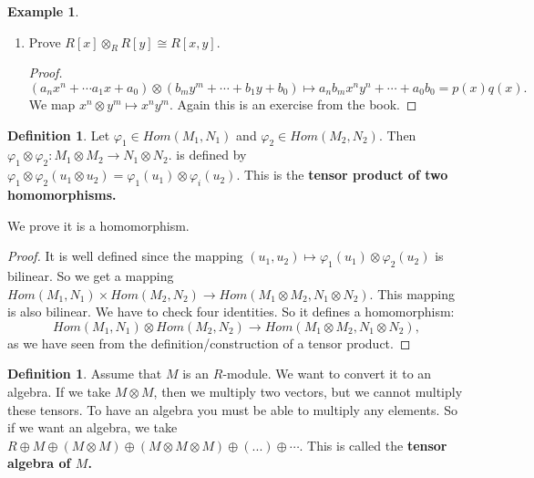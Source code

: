 \documentclass[9pt,reqno,twoside]{amsbook}
\theoremstyle{plain}
\numberwithin{section}{chapter}
\numberwithin{equation}{chapter}
\theoremstyle{definition}
\newtheorem{Def}[theorem]{Definition}
\newtheorem{Ex}[theorem]{Example}
\theoremstyle{remark}
\theoremstyle{plain}
\newcommand{\tens}{\otimes}
\renewcommand{\phi}{\varphi}
\begin{document}
\begin{Ex}
\begin{enumerate}
\begin{proof}
You need to check something like this:
$$
(\alpha_1 \tens (a_1x^n + \cdots + a_1x + a_0)) \cdot (\alpha_2 \tens (...)).
$$
The map would be given by: 
$$
\alpha_1 \tens (a_1x^n + \cdots + a_1x + a_0)\mapsto a_n\alpha x^n + \cdots a_1 \alpha x + a_0\alpha.
$$
Here it is just defined for simple tensors. So any polynomial of $S$ is the image of some tensor, since we have:
$$
\alpha_n \tens x^n + \cdots + \alpha_1 \tens x + \alpha_0 \tens 1 \mapsto \alpha_nx^n + \cdots + \alpha_1 x + \alpha_0.
$$
\end{proof}

\item Prove $R[x] \tens_R R[y] \cong R[x,y]$. 

\begin{proof}
$$
(a_nx^n + \cdots a_1 x + a_0) \tens (b_my^m + \cdots + b_1 y + b_0) \mapsto a_nb_mx^ny^n + \cdots + a_0b_0 = p(x)q(x).
$$
We map $x^n \tens y^m \mapsto x^n y^m$. Again this is an exercise from the book. 
\end{proof}

\end{enumerate}
\end{Ex}

\begin{Def}
Let $\phi_1 \in Hom(M_1,N_1)$ and $\phi_2 \in Hom(M_2,N_2)$. Then $\phi_1 \tens \phi_2: M_1 \tens M_2 \to N_1 \tens N_2$. is defined by $\phi_1 \tens \phi_2(u_1 \tens u_2) = \phi_1(u_1) \tens \phi_i(u_2)$. This is the \textbf{tensor product of two homomorphisms. }
\end{Def}
We prove it is a homomorphism. 
\begin{proof}
It is well defined since the mapping $(u_1,u_2) \mapsto \phi_1(u_1) \tens \phi_2(u_2)$ is bilinear. 
So we get a mapping $Hom(M_1,N_1) \times Hom(M_2,N_2) \to Hom(M_1 \tens M_2,N_1 \tens N_2)$. This mapping is also bilinear. We have to check four identities. So it defines a homomorphism: 
$$
Hom(M_1,N_1) \tens Hom(M_2,N_2) \to Hom(M_1 \tens M_2,N_1 \tens N_2),
$$
as we have seen from the definition/construction of a tensor product. 
\end{proof}

\begin{Def}
Assume that $M$ is an $R$-module. We want to convert it to an algebra. If we take $M \tens M$, then we multiply two vectors, but we cannot multiply these tensors. To have an algebra you must be able to multiply any elements. So if we want an algebra, we take $R \oplus M \oplus (M \tens M) \oplus (M \tens M \tens M) \oplus (...) \oplus \cdots$. 
This is called the \textbf{tensor algebra of $M$. }
\end{Def} \label{gradedalgebra}
\end{document}

